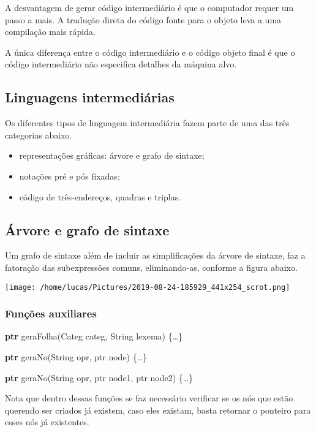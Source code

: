 \documentclass[11pt]{article}
\begin{document}
A desvantagem de gerar código intermediário é que o computador
requer um passo a mais. A tradução direta do código fonte para o
objeto leva a uma compilação mais rápida.

A única diferença entre o código intermediário e o código objeto
final é que o código intermediário não especifica detalhes da
máquina alvo.

\subsection{Linguagens intermediárias}
\label{sec:org0b24f49}
Os diferentes tipos de linguagem intermediária fazem parte de uma
das três categorias abaixo.

\begin{itemize}
\item representações gráficas: árvore e grafo de sintaxe;
\item notações pré e pós fixadas;
\item código de três-endereços, quadras e triplas.
\end{itemize}


\subsection{Árvore e grafo de sintaxe}
\label{sec:org69cae3d}
Um grafo de sintaxe além de incluir as simplificações da árvore de
sintaxe, faz a fatoração das subexpressões comuns, eliminando-as,
conforme a figura abaixo.

\begin{center}
\texttt{[image: /home/lucas/Pictures/2019-08-24-185929\_441x254\_scrot.png]}
\end{center}


\subsubsection{Funções auxiliares}
\label{sec:org7c412b1}

\textbf{ptr} geraFolha(Categ categ, String lexema) \{\ldots{}\}

\textbf{ptr} geraNo(String opr, ptr node) \{\ldots{}\}

\textbf{ptr} geraNo(String opr, ptr node1, ptr node2) \{\ldots{}\}

Nota que dentro dessas funções se faz necessário verificar se os
nós que estão querendo ser criados já existem, caso eles existam,
basta retornar o ponteiro para esses nós já existentes.
\end{document}
